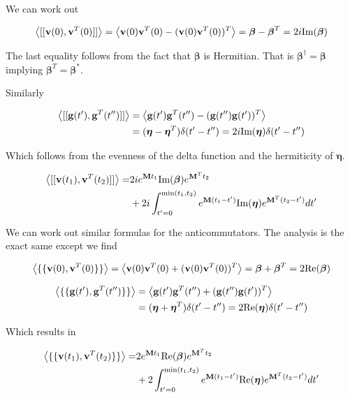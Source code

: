 \documentclass[12pt]{article}
\newcommand{\bv}[1]{\bold{#1}}
\begin{document}
We can work out 

\begin{align}
\Braket{[[\bv{v}(0),\bv{v}^T(0)]]} = \Braket{\bv{v}(0)\bv{v}^T(0) - (\bv{v}(0)\bv{v}^T(0))^T} = \boldsymbol{\beta} - \boldsymbol{\beta}^T = 2i \text{Im}(\boldsymbol{\beta})
\end{align}

The last equality follows from the fact that $\boldsymbol{\beta}$ is Hermitian. That is $\boldsymbol{\beta}^{\dag} = \boldsymbol{\beta}$ implying $\boldsymbol{\beta}^T = \boldsymbol{\beta}^*$.

Similarly

\begin{align}
\Braket{[[\bv{g}(t'),\bv{g}^T(t'')]]} &= \Braket{\bv{g}(t')\bv{g}^T(t'') - (\bv{g}(t'')\bv{g}(t'))^T}\\
&= (\boldsymbol{\eta} - \boldsymbol{\eta}^T)\delta(t'-t'') = 2i \text{Im}(\boldsymbol{\eta}) \delta(t'-t'')
\end{align}

Which follows from the evenness of the delta function and the hermiticity of $\boldsymbol{\eta}$.

\begin{align}
\Braket{[[\bv{v}(t_1),\bv{v}^T(t_2)]]} =& 2i e^{\bv{M} t_1} \text{Im}(\boldsymbol{\beta}) e^{\bv{M}^T t_2}\\
&+2i \int_{t'=0}^{\text{min}(t_1,t_2)} e^{\bv{M}(t_1-t')}\text{Im}(\boldsymbol{\eta})e^{\bv{M}^T (t_2-t')} dt'
\end{align}

We can work out similar formulas for the anticommutators. The analysis is the exact same except we find

\begin{align}
\Braket{\{\{\bv{v}(0),\bv{v}^T(0)\}\}} = \Braket{\bv{v}(0)\bv{v}^T(0) + (\bv{v}(0)\bv{v}^T(0))^T} = \boldsymbol{\beta} + \boldsymbol{\beta}^T = 2 \text{Re}(\boldsymbol{\beta})
\end{align}

\begin{align}
\Braket{\{\{\bv{g}(t'),\bv{g}^T(t'')\}\}} &= \Braket{\bv{g}(t')\bv{g}^T(t'') + (\bv{g}(t'')\bv{g}(t'))^T}\\
&= (\boldsymbol{\eta} + \boldsymbol{\eta}^T)\delta(t'-t'') = 2 \text{Re}(\boldsymbol{\eta}) \delta(t'-t'')
\end{align}

Which results in

\begin{align}
\Braket{\{\{\bv{v}(t_1),\bv{v}^T(t_2)\}\}} =& 2 e^{\bv{M} t_1} \text{Re}(\boldsymbol{\beta}) e^{\bv{M}^T t_2}\\
&+2 \int_{t'=0}^{\text{min}(t_1,t_2)} e^{\bv{M}(t_1-t')}\text{Re}(\boldsymbol{\eta})e^{\bv{M}^T (t_2-t')} dt'
\end{align}
\end{document}

